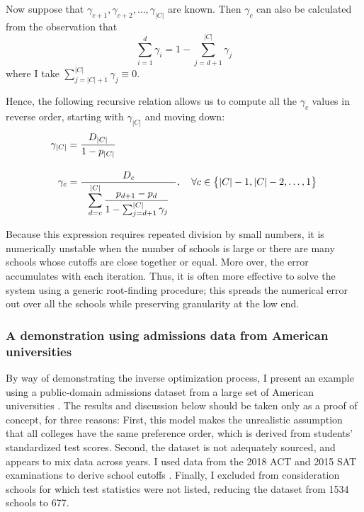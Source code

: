 \documentclass[12pt]{article}
\theoremstyle{definition}
\begin{document}
Now suppose that $\gamma_{c+1}, \gamma_{c+2}, \dots, \gamma_{|C|}$ are known. Then $\gamma_c$ can also be calculated from the observation that
\[\sum_{i=1}^d \gamma_i = 1 - \sum_{j=d+1}^{|C|} \gamma_j\]
where I take $\sum_{j=|C|+1}^{|C|} \gamma_j \equiv 0$.

Hence, the following recursive relation allows us to compute all the $\gamma_c$ values in reverse order, starting with $\gamma_{|C|}$ and moving down:
\begin{align}
\gamma_{|C|} &= \frac{D_{|C|}}{1 - p_{|C|}} \\[1em]
\gamma_c &= \frac{D_c}{~~\mathlarger{\sum_{d=c}^{|C|} \frac{p_{d+1} - p_d}{1 - \sum_{j=d+1}^{|C|} \gamma_j} ~~}}, \quad \forall c \in \bigl\{ |C|-1, |C|-2, \dots, 1\bigr\} \label{gammarecursion}
\end{align}

Because this expression requires repeated division by small numbers, it is numerically unstable when the number of schools is large or there are many schools whose cutoffs are close together or equal. More over, the error accumulates with each iteration. Thus, it is often more effective to solve the system \label{solvemeforgamma} using a generic root-finding procedure; this spreads the numerical error out over all the schools while preserving granularity at the low end. 

\subsubsection{A demonstration using admissions data from American universities}
By way of demonstrating the inverse optimization process, I present an example using a public-domain admissions dataset from a large set of American universities \parencite[][]{collegeadmissionskaggle}. The results and discussion below should be taken only as a proof of concept, for three reasons: First, this model makes the unrealistic assumption that all colleges have the same preference order, which is derived from students' standardized test scores. Second, the dataset is not adequately sourced, and appears to mix data across years. I used data from the 2018 ACT and 2015 SAT examinations to derive school cutoffs \parencite[][]{ACTprofilerpt, SATpercentileranks}. Finally, I excluded from consideration schools for which test statistics were not listed, reducing the dataset from 1534 schools to 677.
\end{document}
